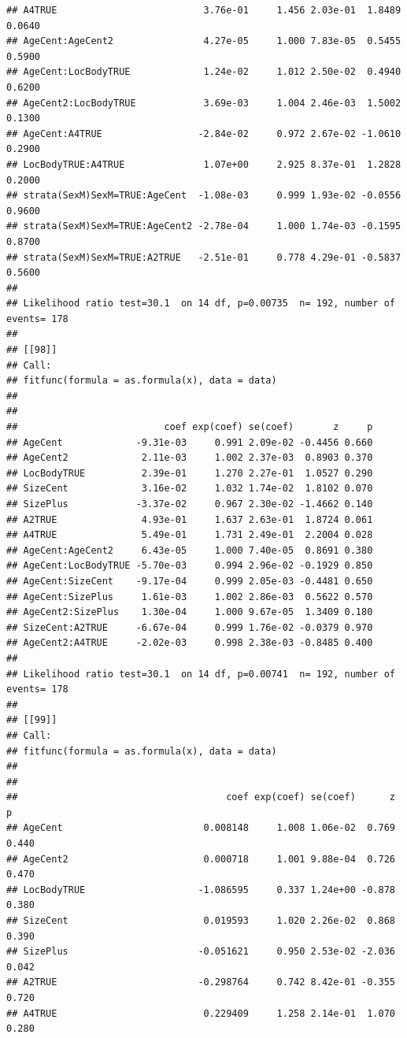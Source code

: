 \documentclass{article}\usepackage[]{graphicx}\usepackage[]{color}
\makeatletter
\newenvironment{kframe}{%
 \def\at@end@of@kframe{}%
 \ifinner\ifhmode%
  \def\at@end@of@kframe{\end{minipage}}%
  \begin{minipage}{\columnwidth}%
 \fi\fi%
 \def\FrameCommand##1{\hskip\@totalleftmargin \hskip-\fboxsep
 \colorbox{shadecolor}{##1}\hskip-\fboxsep
     \hskip-\linewidth \hskip-\@totalleftmargin \hskip\columnwidth}%
 \MakeFramed {\advance\hsize-\width
   \@totalleftmargin\z@ \linewidth\hsize
   \@setminipage}}%
 {\par\unskip\endMakeFramed%
 \at@end@of@kframe}
\newenvironment{knitrout}{}{} %
\makeatother
\begin{document}
\begin{knitrout}
\begin{kframe}
\begin{verbatim}
## A4TRUE                          3.76e-01     1.456 2.03e-01  1.8489 0.0640
## AgeCent:AgeCent2                4.27e-05     1.000 7.83e-05  0.5455 0.5900
## AgeCent:LocBodyTRUE             1.24e-02     1.012 2.50e-02  0.4940 0.6200
## AgeCent2:LocBodyTRUE            3.69e-03     1.004 2.46e-03  1.5002 0.1300
## AgeCent:A4TRUE                 -2.84e-02     0.972 2.67e-02 -1.0610 0.2900
## LocBodyTRUE:A4TRUE              1.07e+00     2.925 8.37e-01  1.2828 0.2000
## strata(SexM)SexM=TRUE:AgeCent  -1.08e-03     0.999 1.93e-02 -0.0556 0.9600
## strata(SexM)SexM=TRUE:AgeCent2 -2.78e-04     1.000 1.74e-03 -0.1595 0.8700
## strata(SexM)SexM=TRUE:A2TRUE   -2.51e-01     0.778 4.29e-01 -0.5837 0.5600
## 
## Likelihood ratio test=30.1  on 14 df, p=0.00735  n= 192, number of events= 178 
## 
## [[98]]
## Call:
## fitfunc(formula = as.formula(x), data = data)
## 
## 
##                          coef exp(coef) se(coef)       z     p
## AgeCent             -9.31e-03     0.991 2.09e-02 -0.4456 0.660
## AgeCent2             2.11e-03     1.002 2.37e-03  0.8903 0.370
## LocBodyTRUE          2.39e-01     1.270 2.27e-01  1.0527 0.290
## SizeCent             3.16e-02     1.032 1.74e-02  1.8102 0.070
## SizePlus            -3.37e-02     0.967 2.30e-02 -1.4662 0.140
## A2TRUE               4.93e-01     1.637 2.63e-01  1.8724 0.061
## A4TRUE               5.49e-01     1.731 2.49e-01  2.2004 0.028
## AgeCent:AgeCent2     6.43e-05     1.000 7.40e-05  0.8691 0.380
## AgeCent:LocBodyTRUE -5.70e-03     0.994 2.96e-02 -0.1929 0.850
## AgeCent:SizeCent    -9.17e-04     0.999 2.05e-03 -0.4481 0.650
## AgeCent:SizePlus     1.61e-03     1.002 2.86e-03  0.5622 0.570
## AgeCent2:SizePlus    1.30e-04     1.000 9.67e-05  1.3409 0.180
## SizeCent:A2TRUE     -6.67e-04     0.999 1.76e-02 -0.0379 0.970
## AgeCent2:A4TRUE     -2.02e-03     0.998 2.38e-03 -0.8485 0.400
## 
## Likelihood ratio test=30.1  on 14 df, p=0.00741  n= 192, number of events= 178 
## 
## [[99]]
## Call:
## fitfunc(formula = as.formula(x), data = data)
## 
## 
##                                     coef exp(coef) se(coef)      z     p
## AgeCent                         0.008148     1.008 1.06e-02  0.769 0.440
## AgeCent2                        0.000718     1.001 9.88e-04  0.726 0.470
## LocBodyTRUE                    -1.086595     0.337 1.24e+00 -0.878 0.380
## SizeCent                        0.019593     1.020 2.26e-02  0.868 0.390
## SizePlus                       -0.051621     0.950 2.53e-02 -2.036 0.042
## A2TRUE                         -0.298764     0.742 8.42e-01 -0.355 0.720
## A4TRUE                          0.229409     1.258 2.14e-01  1.070 0.280

\end{verbatim}
\end{kframe}
\end{knitrout}
\end{document}
